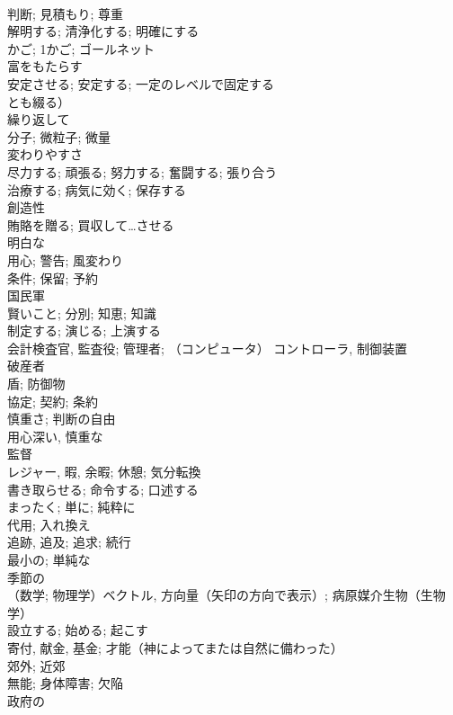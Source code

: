 \documentclass[8pt]{extreport}
\begin{document}
\begin{CJK}{UTF8}{min}
\\	判断; 見積もり; 尊重	
\\	解明する; 清浄化する; 明確にする	
\\	かご; 1かご; ゴールネット	
\\	富をもたらす	
\\	安定させる; 安定する; 一定のレベルで固定する
\\	とも綴る）	
\\	繰り返して	
\\	分子; 微粒子; 微量	
\\	変わりやすさ	
\\	尽力する; 頑張る; 努力する; 奮闘する; 張り合う	
\\	治療する; 病気に効く; 保存する	
\\	創造性	
\\	賄賂を贈る; 買収して…させる	
\\	明白な	
\\	用心; 警告; 風変わり	
\\	条件; 保留; 予約	
\\	国民軍	
\\	賢いこと; 分別; 知恵; 知識	
\\	制定する; 演じる; 上演する	
\\	会計検査官, 監査役; 管理者; （コンピュータ） コントローラ, 制御装置	
\\	破産者	
\\	盾; 防御物	
\\	協定; 契約; 条約	
\\	慎重さ; 判断の自由	
\\	用心深い, 慎重な	
\\	監督	
\\	レジャー, 暇, 余暇; 休憩; 気分転換	
\\	書き取らせる; 命令する; 口述する	
\\	まったく; 単に; 純粋に	
\\	代用; 入れ換え	
\\	追跡, 追及; 追求; 続行	
\\	最小の; 単純な	
\\	季節の	
\\	（数学; 物理学）ベクトル, 方向量（矢印の方向で表示）; 病原媒介生物（生物学）	
\\	設立する; 始める; 起こす	
\\	寄付, 献金, 基金; 才能（神によってまたは自然に備わった）	
\\	郊外; 近郊	
\\	無能; 身体障害; 欠陥	
\\	政府の	

\end{CJK}
\end{document}
